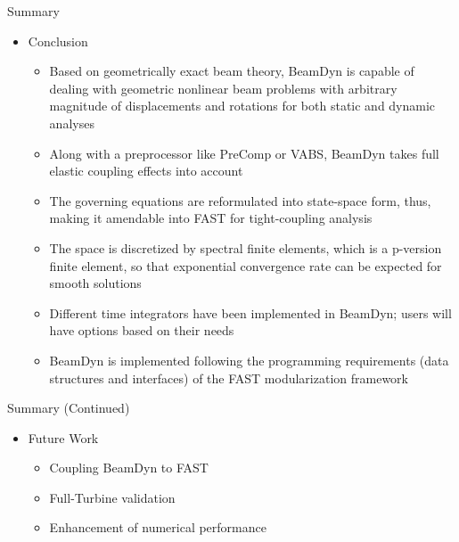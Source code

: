 \documentclass[dvips,xcolor=cmyk]{beamer}
\begin{document}
\begin{frame}{Summary}
    \begin{itemize}
        \item Conclusion
        \begin{itemize}
        \item Based on \alert{geometrically exact beam theory}, BeamDyn is capable of dealing with \alert{geometric nonlinear} beam problems with arbitrary magnitude of displacements and rotations for both static and dynamic analyses
        \item Along with a preprocessor like PreComp or VABS, BeamDyn takes \alert{full elastic coupling effects} into account
  \item The governing equations are reformulated into \alert{state-space form}, thus, making it amendable into FAST for tight-coupling analysis
  \item The space is discretized by \alert{spectral finite elements}, which is a p-version finite element, so that \alert{exponential convergence rate} can be expected for smooth solutions
  \item \alert{Different time integrators} have been implemented in BeamDyn; users will have options based on their needs
  \item BeamDyn is implemented following the programming requirements (data structures and interfaces) of the \alert{FAST modularization framework}
        \end{itemize}
    \end{itemize}
\end{frame}

\begin{frame}{Summary (Continued)}
   \begin{itemize}
   \item Future Work
    \begin{itemize}
            \item Coupling BeamDyn to FAST
            \item Full-Turbine validation
            \item Enhancement of numerical performance
        \end{itemize}
   \end{itemize}   
\end{frame}
\end{document}

